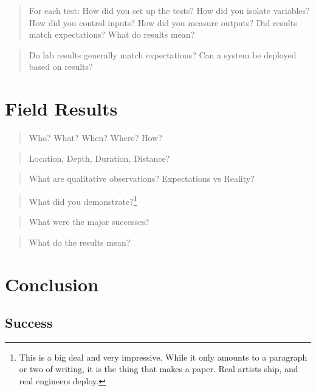 \documentclass[
  10pt,
  draftcls,
  technote,
  letterpaper,
  oneside,
  onecolumn]{IEEEtran}
\begin{document}
\begin{quote}
For each test: How did you set up the tests? How did you isolate
variables? How did you control inputs? How did you measure outputs? Did
results match expectations? What do results mean?
\end{quote}

\begin{quote}
Do lab results generally match expectations? Can a system be deployed
based on results?
\end{quote}

\hypertarget{field-results}{%
\section{Field Results}\label{field-results}}

\begin{quote}
Who? What? When? Where? How?
\end{quote}

\begin{quote}
Location, Depth, Duration, Distance?
\end{quote}

\begin{quote}
What are qualitative observations? Expectations vs Reality?
\end{quote}

\begin{quote}
What did you demonstrate?\footnote{This is a big deal and very
  impressive. While it only amounts to a paragraph or two of writing, it
  is the thing that makes a paper. Real artists ship, and real engineers
  deploy.}
\end{quote}

\begin{quote}
What were the major successes?
\end{quote}

\begin{quote}
What do the results mean?
\end{quote}

\hypertarget{conclusion}{%
\section{Conclusion}\label{conclusion}}

\hypertarget{success}{%
\subsection{Success}\label{success}}
\end{document}
